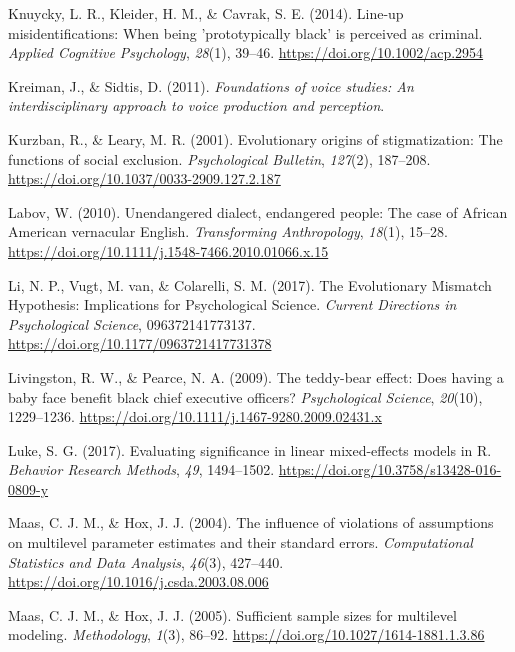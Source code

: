 \documentclass[
  english,
  man]{apa6}
\begin{document}
\leavevmode\hypertarget{ref-Knuycky2014}{}%
Knuycky, L. R., Kleider, H. M., \& Cavrak, S. E. (2014). Line-up misidentifications: When being 'prototypically black' is perceived as criminal. \emph{Applied Cognitive Psychology}, \emph{28}(1), 39--46. \url{https://doi.org/10.1002/acp.2954}

\leavevmode\hypertarget{ref-Kreiman2011}{}%
Kreiman, J., \& Sidtis, D. (2011). \emph{Foundations of voice studies: An interdisciplinary approach to voice production and perception}.

\leavevmode\hypertarget{ref-Kurzban2001}{}%
Kurzban, R., \& Leary, M. R. (2001). Evolutionary origins of stigmatization: The functions of social exclusion. \emph{Psychological Bulletin}, \emph{127}(2), 187--208. \url{https://doi.org/10.1037/0033-2909.127.2.187}

\leavevmode\hypertarget{ref-Labov2010}{}%
Labov, W. (2010). Unendangered dialect, endangered people: The case of African American vernacular English. \emph{Transforming Anthropology}, \emph{18}(1), 15--28. \url{https://doi.org/10.1111/j.1548-7466.2010.01066.x.15}

\leavevmode\hypertarget{ref-Li2017}{}%
Li, N. P., Vugt, M. van, \& Colarelli, S. M. (2017). The Evolutionary Mismatch Hypothesis: Implications for Psychological Science. \emph{Current Directions in Psychological Science}, 096372141773137. \url{https://doi.org/10.1177/0963721417731378}

\leavevmode\hypertarget{ref-Livingston2009}{}%
Livingston, R. W., \& Pearce, N. A. (2009). The teddy-bear effect: Does having a baby face benefit black chief executive officers? \emph{Psychological Science}, \emph{20}(10), 1229--1236. \url{https://doi.org/10.1111/j.1467-9280.2009.02431.x}

\leavevmode\hypertarget{ref-Luke2017}{}%
Luke, S. G. (2017). Evaluating significance in linear mixed-effects models in R. \emph{Behavior Research Methods}, \emph{49}, 1494--1502. \url{https://doi.org/10.3758/s13428-016-0809-y}

\leavevmode\hypertarget{ref-Maas2004}{}%
Maas, C. J. M., \& Hox, J. J. (2004). The influence of violations of assumptions on multilevel parameter estimates and their standard errors. \emph{Computational Statistics and Data Analysis}, \emph{46}(3), 427--440. \url{https://doi.org/10.1016/j.csda.2003.08.006}

\leavevmode\hypertarget{ref-Maas2005}{}%
Maas, C. J. M., \& Hox, J. J. (2005). Sufficient sample sizes for multilevel modeling. \emph{Methodology}, \emph{1}(3), 86--92. \url{https://doi.org/10.1027/1614-1881.1.3.86}
\end{document}
